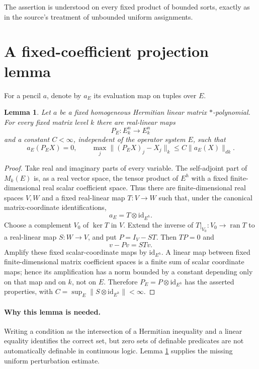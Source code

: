\documentclass[11pt]{article}
\newtheorem{lemma}{Lemma}
\newcommand{\id}{\mathrm{id}}
\begin{document}
The assertion is understood on every fixed product of bounded sorts, exactly
as in the source's treatment of unbounded uniform assignments.

\section{A fixed-coefficient projection lemma}

For a pencil $a$, denote by $a_E$ its evaluation map on tuples over $E$.

\begin{lemma}\label{lem:projection}
Let $a$ be a fixed homogeneous Hermitian linear matrix $*$-polynomial. For
every fixed matrix level $k$ there are real-linear maps
\[
 P_E:E_k^n\longrightarrow E_k^n
\]
and a constant $C<\infty$, independent of the operator system $E$, such that
\[
 a_E(P_EX)=0,
 \qquad
 \max_j\|(P_EX)_j-X_j\|_k\le C\|a_E(X)\|_{dk}.
\]
\end{lemma}

\begin{proof}
Take real and imaginary parts of every variable. The self-adjoint part of
$M_k(E)$ is, as a real vector space, the tensor product of $E^h$ with a fixed
finite-dimensional real scalar coefficient space. Thus there are
finite-dimensional real spaces $V,W$ and a fixed real-linear map $T:V\to W$
such that, under the canonical matrix-coordinate identifications,
\[
 a_E=T\otimes\id_{E^h}.
\]
Choose a complement $V_0$ of $\ker T$ in $V$. Extend the inverse of
$T|_{V_0}:V_0\to\operatorname{ran}T$ to a real-linear map $S:W\to V$, and
put $P=I_V-ST$. Then $TP=0$ and
\[
 v-Pv=STv.
\]
Amplify these fixed scalar-coordinate maps by $\id_{E^h}$. A linear map
between fixed finite-dimensional matrix coefficient spaces is a finite sum of
scalar coordinate maps; hence its amplification has a norm bounded by a
constant depending only on that map and on $k$, not on $E$. Therefore
$P_E=P\otimes\id_{E^h}$ has the asserted properties, with
$C=\sup_E\|S\otimes\id_{E^h}\|<\infty$.
\end{proof}

\paragraph{Why this lemma is needed.}
Writing a condition as the intersection of a Hermitian inequality and a
linear equality identifies the correct set, but zero sets of definable
predicates are not automatically definable in continuous logic. Lemma
\ref{lem:projection} supplies the missing uniform perturbation estimate.
\end{document}

